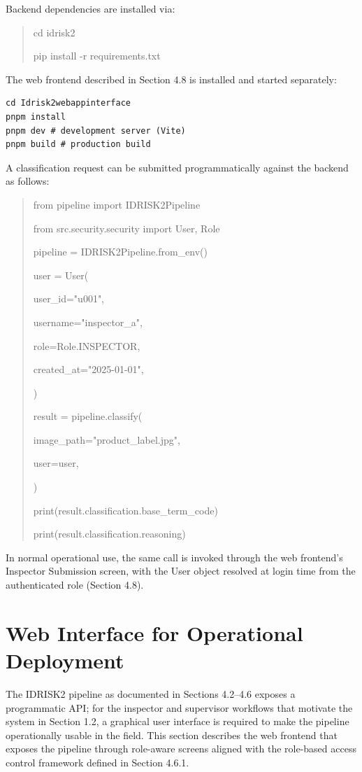 Backend dependencies are installed via:

\begin{quote}
cd idrisk2

pip install -r requirements.txt
\end{quote}

The web frontend described in Section 4.8 is installed and started separately:

\begin{verbatim}
cd Idrisk2webappinterface
pnpm install
pnpm dev # development server (Vite)
pnpm build # production build
\end{verbatim}

A classification request can be submitted programmatically against the backend as follows:

\begin{quote}
from pipeline import IDRISK2Pipeline

from src.security.security import User, Role

pipeline = IDRISK2Pipeline.from\_env()

user = User(

user\_id="u001",

username="inspector\_a",

role=Role.INSPECTOR,

created\_at="2025-01-01",

)

result = pipeline.classify(

image\_path="product\_label.jpg",

user=user,

)

print(result.classification.base\_term\_code)

print(result.classification.reasoning)
\end{quote}

In normal operational use, the same call is invoked through the web frontend's Inspector Submission screen, with the User object resolved at login time from the authenticated role (Section 4.8).

\hypertarget{web-interface-for-operational-deployment}{%
\section{Web Interface for Operational Deployment}\label{web-interface-for-operational-deployment}}

The IDRISK2 pipeline as documented in Sections 4.2--4.6 exposes a programmatic API; for the inspector and supervisor workflows that motivate the system in Section 1.2, a graphical user interface is required to make the pipeline operationally usable in the field. This section describes the web frontend that exposes the pipeline through role-aware screens aligned with the role-based access control framework defined in Section 4.6.1.

